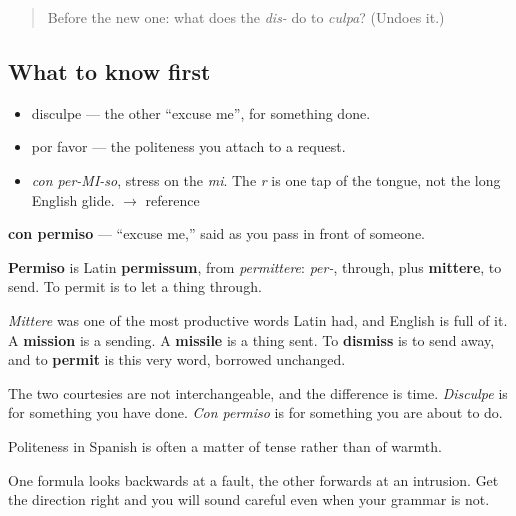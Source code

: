 \label{lesson:ES-C283-permiso}



\begin{quote}
Before the new one: what does the \emph{dis-} do to \emph{culpa}? (Undoes it.)
\end{quote}

\subsection*{What to know first}
\begin{itemize}
\raggedright
  \item disculpe — the other \textquotedblleft{}excuse me\textquotedblright{}, for something done.
  \item por favor — the politeness you attach to a request.
\end{itemize}

\begin{sounds}
\begin{itemize}
\raggedright
  \item \emph{con per-MI-so}, stress on the \emph{mi}. The \emph{r} is one tap of the tongue, not the long English glide. $\to$ reference
\end{itemize}
\end{sounds}

\begin{cousinweb}
\textbf{con permiso} — \textquotedblleft{}excuse me,\textquotedblright{} said as you pass in front of someone.

\textbf{Permiso} is Latin \textbf{permissum}, from \emph{permittere}: \emph{per-}, through, plus \textbf{mittere}, to send. To permit is to let a thing through.

\emph{Mittere} was one of the most productive words Latin had, and English is full of it. A \textbf{mission} is a sending. A \textbf{missile} is a thing sent. To \textbf{dismiss} is to send away, and to \textbf{permit} is this very word, borrowed unchanged.

The two courtesies are not interchangeable, and the difference is time. \emph{Disculpe} is for something you have done. \emph{Con permiso} is for something you are about to do.
\end{cousinweb}

\begin{grammarlens}[title={What you've built}]
Politeness in Spanish is often a matter of tense rather than of warmth.

One formula looks backwards at a fault, the other forwards at an intrusion. Get the direction right and you will sound careful even when your grammar is not.
\end{grammarlens}

